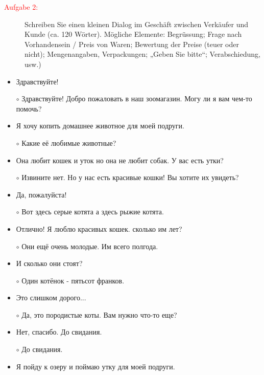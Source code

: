\documentclass[a4paper]{article}
\theoremstyle{plain}
\begin{document}
\begin{description}
 	\item[\textcolor{red}{Aufgabe 2:}] Schreiben Sie einen kleinen Dialog im Geschäft zwischen Verkäufer und Kunde (ca. 120 Wörter). Mögliche Elemente: Begrüssung; Frage nach \linebreak Vorhandensein / Preis von Waren; Bewertung der Preise (teuer oder nicht); \linebreak Mengenangaben, Verpackungen; „Geben Sie bitte“; Verabschiedung, usw.)  
\end{description}
\vspace*{1cm}

\begin{itemize}
	\item Здравствуйте!
	\item[$\circ$] Здравствуйте! Добро пожаловать в наш зоомагазин. Могу ли я вам чем-то помочь?
	\item Я хочу копить домашнее животное для моей подруги.
	\item[$\circ$] Какие её любимые животные?
	\item Она любит кошек и уток но она не любит собак. У вас есть утки?
	\item[$\circ$] Извините нет. Но у нас есть красивые кошки! Вы хотите их увидеть?
	\item Да, пожалуйста!
	\item[$\circ$] Вот здесь серые котята а здесь рыжие котята.
	\item Отлично! Я люблю красивых кошек. сколько им лет?
	\item[$\circ$] Они ещё очень молодые. Им всего полгода.
	\item И сколько они стоят? 
	\item[$\circ$] Один котёнок - пятьсот франков. 
	\item Это слишком дорого...
	\item[$\circ$] Да, это породистые коты. Вам нужно что-то еще?
	\item Нет, спасибо. До свидания.
	\item[$\circ$] До свидания.
	\item Я пойду к озеру и поймаю утку для моей подруги.
\end{itemize}
\end{document}
